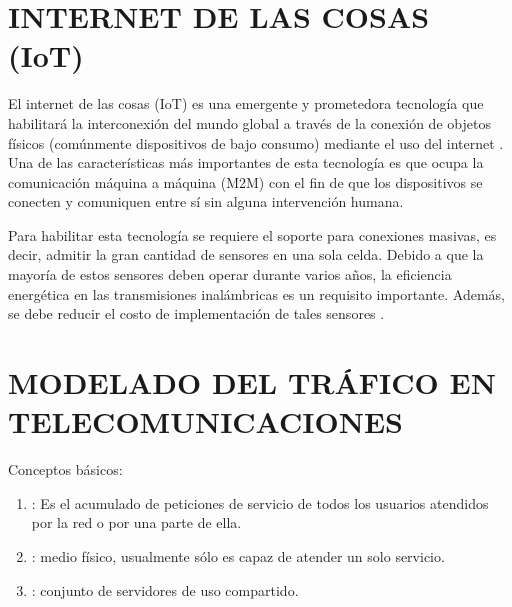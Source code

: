 \section{INTERNET DE LAS COSAS (IoT)}


El internet de las cosas (IoT) es una emergente y prometedora tecnología que habilitará la interconexión del mundo global a través de la conexión de objetos físicos (comúnmente dispositivos de bajo consumo) mediante el uso del internet \parencite{5GSurveyAkpaku}. Una de las características más importantes de esta tecnología es que ocupa la comunicación máquina a máquina (M2M) con el fin de que los dispositivos se conecten y comuniquen entre sí sin alguna intervención humana.\newline

Para habilitar esta tecnología se requiere el soporte para conexiones masivas, es decir, admitir la gran cantidad de sensores en una sola celda. Debido a que la mayoría de estos sensores deben operar durante varios años, la eficiencia energética en las transmisiones inalámbricas es un requisito importante. Además, se debe reducir el costo de implementación de tales sensores \parencite{IoT5GWire}.

\break

\section{MODELADO DEL TRÁFICO EN TELECOMUNICACIONES}

Conceptos básicos:
\begin{enumerate}
\item  {}: Es el acumulado de peticiones de servicio de todos los usuarios atendidos por la red o por una parte de ella.
\item  {}: medio físico, usualmente sólo es capaz de atender un solo servicio.
\item  {}: conjunto de servidores de uso compartido.
\end{enumerate}

